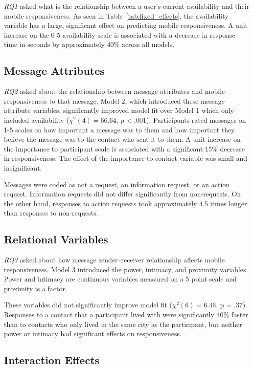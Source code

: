 \documentclass[12pt]{nuthesis}	%
\begin{document}
\textit{RQ1} asked what is the relationship between a user's current availability and their mobile responsiveness. As seen in Table~\ref{tab:fixed_effects}, the availability variable has a large, significant effect on predicting mobile responsiveness.  A unit increase on the 0-5 availability scale is associated with a decrease in response time in seconds by approximately 40\% across all models.

\subsection{Message Attributes}

\textit{RQ2} asked about the relationship between message attributes and mobile responsiveness to that message. Model 2, which introduced these message attribute variables, significantly improved model fit over Model 1 which only included availability ($\chi^2(4) = 66.64$, p < .001). Participants rated messages on 1-5 scales on how important a message was to them and how important they believe the message was to the contact who sent it to them. A unit increase on the importance to participant scale is associated with a significant 15\% decrease in responsiveness. The effect of the importance to contact variable was small and insignificant.

Messages were coded as not a request, an information request, or an action request. Information requests did not differ significantly from non-requests. On the other hand, responses to action requests took approximately 4.5 times longer than responses to non-requests.


\subsection{Relational Variables}

\textit{RQ3} asked about how message sender--receiver relationship affects mobile responsiveness. Model 3 introduced the power, intimacy, and proximity variables. Power and intimacy are continuous variables measured on a 5 point scale and proximity is a factor.

These variables did not significantly improve model fit ($\chi^2(6) = 6.46$, p = .37). Responses to a contact that a participant lived with were significantly 40\% faster than to contacts who only lived in the same city as the participant, but neither power or intimacy had significant effects on responsiveness.

\subsection{Interaction Effects}
\end{document}
